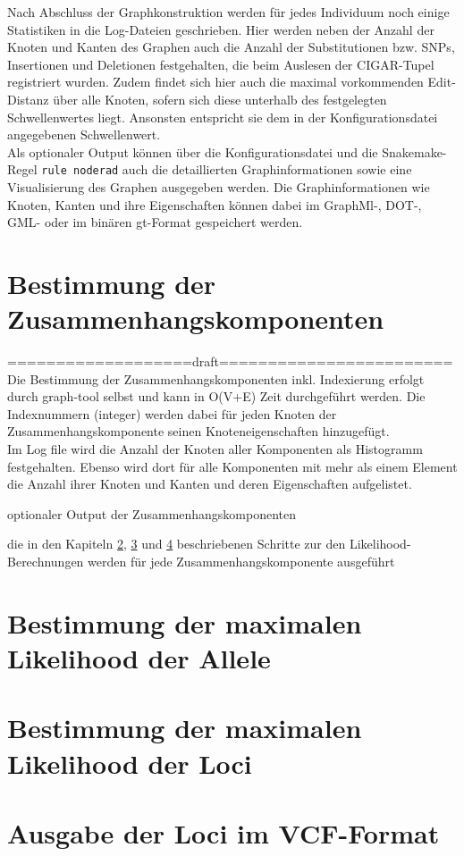 Nach Abschluss der Graphkonstruktion werden für jedes Individuum noch einige Statistiken in die Log-Dateien geschrieben. Hier werden neben der Anzahl der Knoten und Kanten des Graphen auch die Anzahl der Substitutionen bzw. SNPs, Insertionen und Deletionen festgehalten, die beim Auslesen der CIGAR-Tupel registriert wurden. Zudem findet sich hier auch die maximal vorkommenden Edit-Distanz über alle Knoten, sofern sich diese unterhalb des festgelegten Schwellenwertes liegt. Ansonsten entspricht sie dem in der Konfigurationsdatei angegebenen Schwellenwert.\\

Als optionaler Output können über die Konfigurationsdatei und die Snakemake-Regel \lstinline|rule noderad| auch die detaillierten Graphinformationen sowie eine Visualisierung des Graphen ausgegeben werden. Die Graphinformationen wie Knoten, Kanten und ihre Eigenschaften können dabei im GraphMl-, DOT-, GML- oder im binären gt-Format gespeichert werden. \\

\section{Bestimmung der Zusammenhangskomponenten} \label{sec:comp}
===================draft========================\\
Die Bestimmung der Zusammenhangskomponenten inkl. Indexierung erfolgt durch graph-tool selbst und kann in O(V+E) Zeit durchgeführt werden. Die Indexnummern (integer) werden dabei für jeden Knoten der Zusammenhangskomponente seinen Knoteneigenschaften hinzugefügt.\\
Im Log file wird die Anzahl der Knoten aller Komponenten als Histogramm festgehalten. Ebenso wird dort für alle Komponenten mit mehr als einem Element die Anzahl ihrer Knoten und Kanten und deren Eigenschaften aufgelistet.

optionaler Output der Zusammenhangskomponenten

die in den Kapiteln \ref{sec:lh_allele}, \ref{sec:lh_loci} und \ref{sec:vcf} beschriebenen Schritte zur den Likelihood-Berechnungen werden für jede Zusammenhangskomponente ausgeführt

\section{Bestimmung der maximalen Likelihood der Allele} \label{sec:lh_allele}
\subsection{} \label{subsec:}


\section{Bestimmung der maximalen Likelihood der Loci} \label{sec:lh_loci}
\subsection{} \label{subsec:}


\section{Ausgabe der Loci im VCF-Format} \label{sec:vcf}
\subsection{} \label{subsec:}
